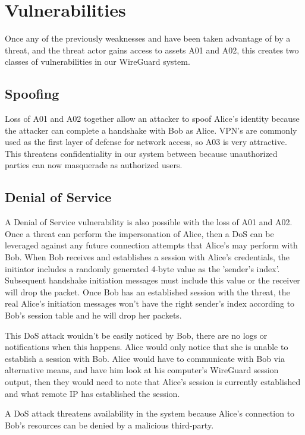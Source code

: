 \documentclass [11pt, proquest] {uwthesis}[2020/02/24]
\begin{document}
\section{Vulnerabilities}
Once any of the previously weaknesses and have been taken advantage of by a threat, and the threat actor gains access to assets A01 and A02, this creates two classes of vulnerabilities in our WireGuard system.

\subsection{Spoofing}
\label{spoofing}
Loss of A01 and A02 together allow an attacker to spoof Alice's identity because the attacker can complete a handshake with Bob as Alice. VPN's are commonly used as the first layer of defense for network access, so A03 is very attractive.
This threatens confidentiality in our system between because unauthorized parties can now masquerade as authorized users. 

\subsection{Denial of Service}
\label{dos}
A Denial of Service vulnerability is also possible with the loss of A01 and A02. Once a threat can perform the impersonation of Alice, then a DoS can be leveraged against any future connection attempts that Alice's may perform with Bob. When Bob receives and establishes a session with Alice's credentials, the initiator includes a randomly generated 4-byte value as the 'sender's index'. Subsequent handshake initiation messages must include this value or the receiver will drop the packet. Once Bob has an established session with the threat, the real Alice's initiation messages won't have the right sender's index according to Bob's session table and he will drop her packets.

This DoS attack wouldn't be easily noticed by Bob, there are no logs or notifications when this happens. Alice would only notice that she is unable to establish a session with Bob. Alice would have to communicate with Bob via alternative means, and have him look at his computer's WireGuard session output, then they would need to note that Alice's session is currently established and what remote IP has established the session.

A DoS attack threatens availability in the system because Alice's connection to Bob's resources can be denied by a malicious third-party.
\end{document}
